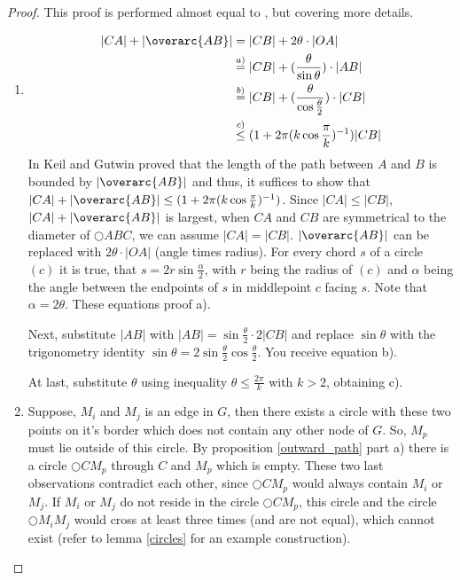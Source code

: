 \begin{proof}
This proof is performed almost equal to \cite{kanj}, but covering more details.
\renewcommand{\labelenumi}{(\roman{enumi})}%
\begin{enumerate}
\item 
\begin{equation*}
\begin{split}
|CA|+|\overarc{AB}| &= |CB| + 2\theta \cdot |OA| \\
&\stackrel{a)}{=}|CB| + (\frac{\theta}{\sin{\theta}})\cdot |AB| \\
&\stackrel{b)}{=} |CB| + (\frac{\theta}{\cos{\frac{\theta}{2}}}) \cdot |CB|\\
&\stackrel{c)}{\leq} (1+2\pi(k \cos{\frac{\pi}{k}})^{-1}) |CB|  
\end{split}
\end{equation*}
In \cite{keil} Keil and Gutwin proved that the length of the path between $A $ and $B $ is bounded by $|\overarc{AB}|$ and thus, it suffices to show that $|CA| + |\overarc{AB}|\leq (1+2\pi(k \cos{\frac{\pi}{k}})^{-1})$.
Since $|CA| \leq |CB| $, $|CA|+|\overarc{AB}| $ is largest, when $CA $ and $CB $ are symmetrical to the diameter of $\bigcirc{ABC} $, we can assume $|CA|=|CB| $.
$|\overarc{AB}| $ can be replaced with $2\theta \cdot |OA| $ (angle times radius).
For every chord $s $ of a circle $(c) $ it is true, that $s=2r\sin{\frac{\alpha}{2}} $, with $r $ being the radius of $(c) $ and $\alpha $ being the angle between the endpoints of $s $ in middlepoint $c $ facing $s $.
Note that $\alpha = 2\theta $. 
These equations proof a).

Next, substitute $|AB| $ with $|AB| = \sin{\frac{\theta}{2}} \cdot 2|CB| $ and replace $\sin{\theta} $ with the trigonometry identity $\sin{\theta}=2\sin{\frac{\theta}{2}} \cos{\frac{\theta}{2}} $.
You receive equation b).

At last, substitute $\theta $ using inequality $\theta \leq \frac{2\pi}{k} $ with $k > 2 $, obtaining c).

\item  Suppose, $M_i $ and $M_j $ is an edge in $G $, then there exists a circle with these two points on it's border which does not contain any other node of $G $.
So, $M_p $ must lie outside of this circle.
By proposition \ref{outward_path} part a) there is a circle $\bigcirc{CM_p} $ through $C $ and $M_p $ which is empty.
These two last observations contradict each other, since $\bigcirc{CM_p} $ would always contain $M_i $ or $M_j $.
If $M_i $ or $M_j $ do not reside in the circle $\bigcirc{CM_p} $, this circle and the circle $\bigcirc{M_iM_j} $ would cross at least three times (and are not equal), which cannot exist (refer to lemma \ref{circles} for an example construction).


\end{enumerate}
\end{proof}
